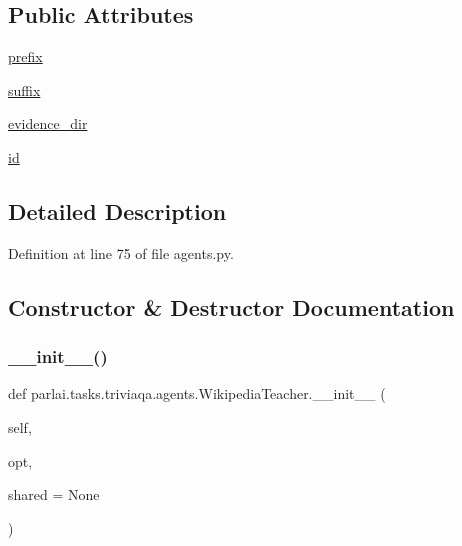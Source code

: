 \subsection*{Public Attributes}
\begin{DoxyCompactItemize}
\item 
\hyperlink{classparlai_1_1tasks_1_1triviaqa_1_1agents_1_1WikipediaTeacher_a5b37aa1d9fc169e9daeb33ebcaa1f259}{prefix}
\item 
\hyperlink{classparlai_1_1tasks_1_1triviaqa_1_1agents_1_1WikipediaTeacher_aff5be8d4af8ead80a67963cdfe9a7f08}{suffix}
\item 
\hyperlink{classparlai_1_1tasks_1_1triviaqa_1_1agents_1_1WikipediaTeacher_ae361f0f221fa8d8aa814d68dfcd30e25}{evidence\+\_\+dir}
\item 
\hyperlink{classparlai_1_1tasks_1_1triviaqa_1_1agents_1_1WikipediaTeacher_af8a1bc2da82beacd3b734238d8e2f955}{id}
\end{DoxyCompactItemize}


\subsection{Detailed Description}


Definition at line 75 of file agents.\+py.



\subsection{Constructor \& Destructor Documentation}
\mbox{\label{classparlai_1_1tasks_1_1triviaqa_1_1agents_1_1WikipediaTeacher_a8f98e896d67718624f8304ad03a08def}} 
\subsubsection{\texorpdfstring{\+\_\+\+\_\+init\+\_\+\+\_\+()}{\_\_init\_\_()}}
{\footnotesize\ttfamily def parlai.\+tasks.\+triviaqa.\+agents.\+Wikipedia\+Teacher.\+\_\+\+\_\+init\+\_\+\+\_\+ (\begin{DoxyParamCaption}\item[{}]{self,  }\item[{}]{opt,  }\item[{}]{shared = {\ttfamily None} }\end{DoxyParamCaption})}



